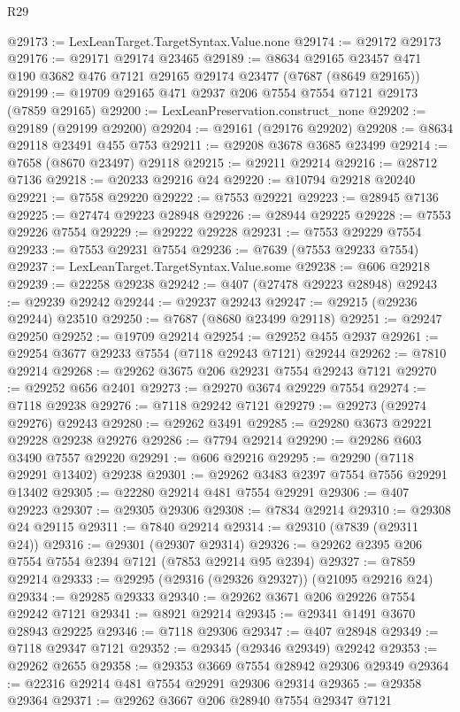 \begin{lexlean}{R29}
\begin{coremodule}
@29173 := LexLeanTarget.TargetSyntax.Value.none
@29174 := @29172 @29173
@29176 := @29171 @29174 @23465
@29189 := @8634 @29165 @23457 @471 @190 @3682 @476 @7121 @29165 @29174 @23477 (@7687 (@8649 @29165))
@29199 := @19709 @29165 @471 @2937 @206 @7554 @7554 @7121 @29173 (@7859 @29165)
@29200 := LexLeanPreservation.construct_none
@29202 := @29189 (@29199 @29200)
@29204 := @29161 (@29176 @29202)
@29208 := @8634 @29118 @23491 @455 @753
@29211 := @29208 @3678 @3685 @23499
@29214 := @7658 (@8670 @23497) @29118
@29215 := @29211 @29214
@29216 := @28712 @7136
@29218 := @20233 @29216 @24
@29220 := @10794 @29218 @20240
@29221 := @7558 @29220
@29222 := @7553 @29221
@29223 := @28945 @7136
@29225 := @27474 @29223 @28948
@29226 := @28944 @29225
@29228 := @7553 @29226 @7554
@29229 := @29222 @29228
@29231 := @7553 @29229 @7554
@29233 := @7553 @29231 @7554
@29236 := @7639 (@7553 @29233 @7554)
@29237 := LexLeanTarget.TargetSyntax.Value.some
@29238 := @606 @29218
@29239 := @22258 @29238
@29242 := @407 (@27478 @29223 @28948)
@29243 := @29239 @29242
@29244 := @29237 @29243
@29247 := @29215 (@29236 @29244) @23510
@29250 := @7687 (@8680 @23499 @29118)
@29251 := @29247 @29250
@29252 := @19709 @29214
@29254 := @29252 @455 @2937
@29261 := @29254 @3677 @29233 @7554 (@7118 @29243 @7121) @29244
@29262 := @7810 @29214
@29268 := @29262 @3675 @206 @29231 @7554 @29243 @7121
@29270 := @29252 @656 @2401
@29273 := @29270 @3674 @29229 @7554
@29274 := @7118 @29238
@29276 := @7118 @29242 @7121
@29279 := @29273 (@29274 @29276) @29243
@29280 := @29262 @3491
@29285 := @29280 @3673 @29221 @29228 @29238 @29276
@29286 := @7794 @29214
@29290 := @29286 @603 @3490 @7557 @29220
@29291 := @606 @29216
@29295 := @29290 (@7118 @29291 @13402) @29238
@29301 := @29262 @3483 @2397 @7554 @7556 @29291 @13402
@29305 := @22280 @29214 @481 @7554 @29291
@29306 := @407 @29223
@29307 := @29305 @29306
@29308 := @7834 @29214
@29310 := @29308 @24 @29115
@29311 := @7840 @29214
@29314 := @29310 (@7839 (@29311 @24))
@29316 := @29301 (@29307 @29314)
@29326 := @29262 @2395 @206 @7554 @7554 @2394 @7121 (@7853 @29214 @95 @2394)
@29327 := @7859 @29214
@29333 := @29295 (@29316 (@29326 @29327)) (@21095 @29216 @24)
@29334 := @29285 @29333
@29340 := @29262 @3671 @206 @29226 @7554 @29242 @7121
@29341 := @8921 @29214
@29345 := @29341 @1491 @3670 @28943 @29225
@29346 := @7118 @29306
@29347 := @407 @28948
@29349 := @7118 @29347 @7121
@29352 := @29345 (@29346 @29349) @29242
@29353 := @29262 @2655
@29358 := @29353 @3669 @7554 @28942 @29306 @29349
@29364 := @22316 @29214 @481 @7554 @29291 @29306 @29314
@29365 := @29358 @29364
@29371 := @29262 @3667 @206 @28940 @7554 @29347 @7121

\end{coremodule}
\end{lexlean}
